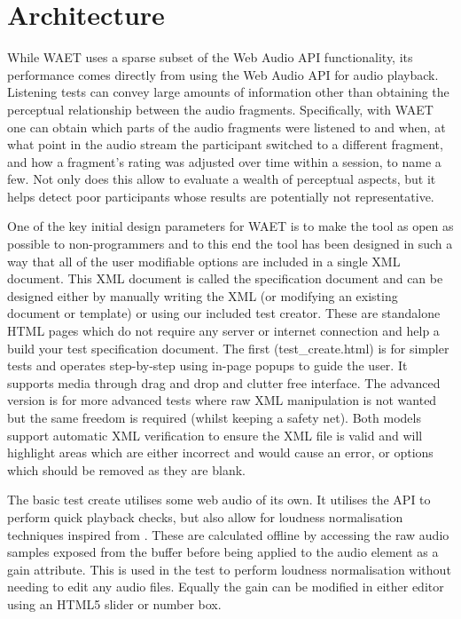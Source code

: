 \documentclass{sig-alternate}
\begin{document}
\section{Architecture}  %

    While WAET uses a sparse subset of the Web Audio API functionality, its performance comes directly from using the Web Audio API for audio playback. Listening tests can convey large amounts of information other than obtaining the perceptual relationship between the audio fragments. Specifically, with WAET one can obtain which parts of the audio fragments were listened to and when, at what point in the audio stream the participant switched to a different fragment, and how a fragment's rating was adjusted over time within a session, to name a few. Not only does this allow to evaluate a wealth of perceptual aspects, but it helps detect poor participants whose results are potentially not representative.
    
    One of the key initial design parameters for WAET is to make the tool as open as possible to non-programmers and to this end the tool has been designed in such a way that all of the user modifiable options are included in a single XML document. This XML document is called the specification document and can be designed either by manually writing the XML (or modifying an existing document or template) or using our included test creator. These are standalone HTML pages which do not require any server or internet connection and help a build your test specification document. The first (test\_create.html) is for simpler tests and operates step-by-step using in-page popups to guide the user. It supports media through drag and drop and clutter free interface. The advanced version is for more advanced tests where raw XML manipulation is not wanted but the same freedom is required (whilst keeping a safety net). Both models support automatic XML verification to ensure the XML file is valid and will highlight areas which are either incorrect and would cause an error, or options which should be removed as they are blank.
    
    The basic test create utilises some web audio of its own. It utilises the API to perform quick playback checks, but also allow for loudness normalisation techniques inspired from \cite{ape}. These are calculated offline by accessing the raw audio samples exposed from the buffer before being applied to the audio element as a gain attribute. This is used in the test to perform loudness normalisation without needing to edit any audio files. Equally the gain can be modified in either editor using an HTML5 slider or number box.
    
\end{document}
